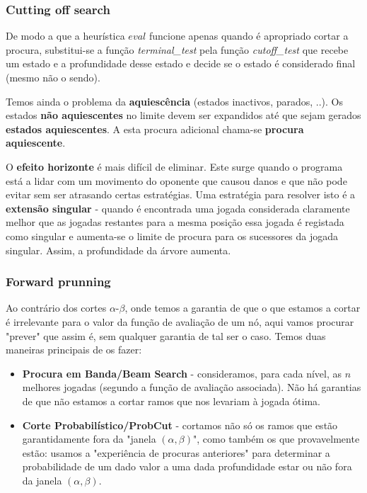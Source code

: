 \documentclass[11pt]{article}
\begin{document}
\subsubsection{Cutting off search}

De modo a que a heurística $eval$ funcione apenas quando é apropriado cortar a procura, substitui-se a função \textit{terminal\_test} pela função \textit{cutoff\_test} que recebe um estado e a profundidade desse estado e decide se o estado é considerado final (mesmo não o sendo).\vspace{4pt}

Temos ainda o problema da \textbf{aquiescência} (estados inactivos, parados, ..). Os estados \textbf{não aquiescentes} no limite devem ser expandidos até que sejam gerados \textbf{estados aquiescentes}. A esta procura adicional chama-se \textbf{procura aquiescente}.\vspace{4pt}

O \textbf{efeito horizonte} é mais difícil de eliminar. Este surge quando o programa está a lidar com um movimento do oponente que causou danos e que não pode evitar sem ser atrasando certas estratégias. Uma estratégia para resolver isto é a \textbf{extensão singular} - quando é encontrada uma jogada considerada claramente melhor que as jogadas restantes para a mesma posição essa jogada é registada como singular e aumenta-se o limite de procura para os sucessores da jogada singular. Assim, a profundidade da árvore aumenta.

\subsubsection{Forward prunning}

Ao contrário dos cortes $\alpha$-$\beta$, onde temos a garantia de que o que estamos a cortar é irrelevante para o valor da função de avaliação de um nó, aqui vamos procurar "prever" que assim é, sem qualquer garantia de tal ser o caso. Temos duas maneiras principais de os fazer:
\begin{itemize}
    \item \textbf{Procura em Banda/Beam Search} - consideramos, para cada nível, as $n$ melhores jogadas (segundo a função de avaliação associada). Não há garantias de que não estamos a cortar ramos que nos levariam à jogada ótima.
    \item \textbf{Corte Probabilístico/ProbCut} - cortamos não só os ramos que estão garantidamente fora da "janela $(\alpha,\beta)$", como também os que provavelmente estão: usamos a "experiência de procuras anteriores" para determinar a probabilidade de um dado valor a uma dada profundidade estar ou não fora da janela $(\alpha,\beta)$.
\end{itemize}
\end{document}
